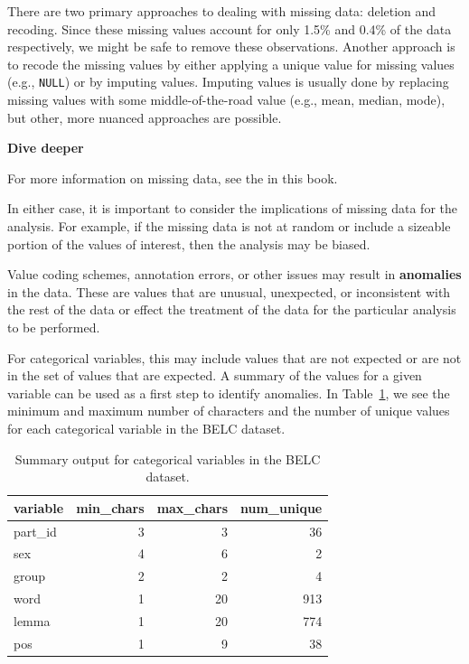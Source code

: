 \documentclass[
  letterpaper,
  DIV=11,
  numbers=noendperiod]{scrreport}
\theoremstyle{definition}
\theoremstyle{remark}
\begin{document}
There are two primary approaches to dealing with missing data: deletion
and recoding. Since these missing values account for only 1.5\% and
0.4\% of the data respectively, we might be safe to remove these
observations. Another approach is to recode the missing values by either
applying a unique value for missing values (e.g., \texttt{NULL}) or by
imputing values. Imputing values is usually done by replacing missing
values with some middle-of-the-road value (e.g., mean, median, mode),
but other, more nuanced approaches are possible.

\begin{tcolorbox}[enhanced jigsaw, breakable, colback=white, rightrule=.15mm, arc=.35mm, left=2mm, toprule=.15mm, leftrule=.75mm, bottomrule=.15mm, opacityback=0]

\textbf{ Dive deeper}

For more information on missing data, see the  in this
book.

\end{tcolorbox}

In either case, it is important to consider the implications of missing
data for the analysis. For example, if the missing data is not at random
or include a sizeable portion of the values of interest, then the
analysis may be biased.

Value coding schemes, annotation errors, or other issues may result in
\textbf{anomalies} in the data. These are values that are unusual,
unexpected, or inconsistent with the rest of the data or effect the
treatment of the data for the particular analysis to be performed.

For categorical variables, this may include values that are not expected
or are not in the set of values that are expected. A summary of the
values for a given variable can be used as a first step to identify
anomalies. In Table~\ref{tbl-aa-belc-skim-categorical}, we see the
minimum and maximum number of characters and the number of unique values
for each categorical variable in the BELC dataset.

\hypertarget{tbl-aa-belc-skim-categorical}{}
\begin{table}
\caption{\label{tbl-aa-belc-skim-categorical}Summary output for categorical variables in the BELC dataset. }\tabularnewline

\centering
\begin{tabular}{l|r|r|r}
\hline
variable & min\_chars & max\_chars & num\_unique\\
\hline
part\_id & 3 & 3 & 36\\
\hline
sex & 4 & 6 & 2\\
\hline
group & 2 & 2 & 4\\
\hline
word & 1 & 20 & 913\\
\hline
lemma & 1 & 20 & 774\\
\hline
pos & 1 & 9 & 38\\
\hline
\end{tabular}
\end{table}
\end{document}
